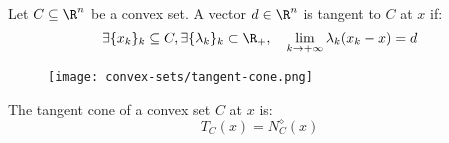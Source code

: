 \begin{definition}
    Let $C\subseteq\R^n$ be a convex set. A vector $d\in\R^n$ is tangent to $C$ at $x$ if:
    \begin{equation*}
        \exists \{x_k\}_k\subseteq C, \exists \{\lambda_k\}_k\subset\R_+, \quad \lim_{k\to+\infty} \lambda_k (x_k-x) = d
    \end{equation*}
    \begin{figure}[H]
        \centering
        \texttt{[image: convex-sets/tangent-cone.png]}
    \end{figure}
\end{definition}

\begin{definition}
    The tangent cone of a convex set $C$ at $x$ is:
    \begin{equation*}
        T_C(x) = N_C^\diamond(x)
    \end{equation*}
\end{definition}